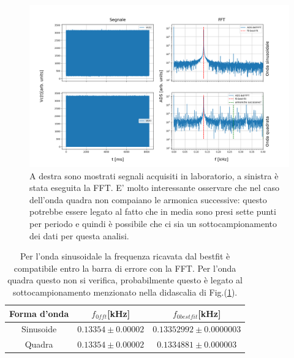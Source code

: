 \documentclass{article}
\begin{document}
         \begin{figure}[H]
            \centering
            \includegraphics[scale=0.45]{FFT5/FFTwaveforms3.png}
            \caption{A destra sono mostrati segnali acquisiti in laboratorio, a sinistra 
                    è stata eseguita la FFT.
                    E' molto interessante osservare che nel caso dell'onda quadra 
                    non compaiano le armonica successive: questo potrebbe essere 
                    legato al fatto che in media sono presi sette punti per periodo e quindi 
                    è possibile che ci sia un sottocampionamento dei dati per questa analisi.}
            \label{fig:for_lun}
        \end{figure}    


         \begin{table}[H]
            \centering
                \begin{tabular}{ccc}
                    Forma d'onda    &   $f_{0fft}$[kHz]                     & $f_{0bestfit}$[kHz] \\
                    \hline
                    Sinusoide       &   $0.13354 \pm 0.00002$           & $0.13352992 \pm 0.0000003$ \\
                    Quadra          &   $0.13354 \pm 0.00002$           & $0.1334881 \pm  0.000003$ \\
                \end{tabular}
                \caption{Per l'onda sinusoidale la frequenza ricavata dal bestfit è compatibile
                entro la barra di errore con la FFT. Per l'onda quadra questo non si verifica, 
                probabilmente questo è legato al sottocampionamento menzionato nella didascalia 
                di Fig.(\ref{fig:for_lun}).}
                \label{tab:for_lun}
        \end{table}
        
\end{document}
